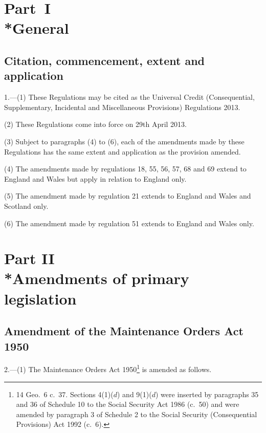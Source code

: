 \documentclass[12pt,a4paper]{article}
\begin{document}
\setcounter{secnumdepth}{-2}

\section[Part I --- General]{Part~I\\*General}

\renewcommand\parthead{--- Part I}

\subsection[1. Citation, commencement, extent and application]{Citation, commencement, extent and application}

1.—(1) These Regulations may be cited as the Universal Credit (Consequential, Supplementary, Incidental and Miscellaneous Provisions) Regulations 2013.

(2) These Regulations come into force on 29th April 2013.

(3) Subject to paragraphs (4) to (6), each of the amendments made by these Regulations has the same extent and application as the provision amended.

(4) The amendments made by regulations 18, 55, 56, 57, 68 and 69 extend to England and Wales but apply in relation to England only.

(5) The amendment made by regulation 21 extends to England and Wales and Scotland only.

(6) The amendment made by regulation 51 extends to England and Wales only.

\section[Part II --- Amendments of primary legislation]{Part II\\*Amendments of primary legislation}

\renewcommand\parthead{--- Part II}

\subsection[2. Amendment of the Maintenance Orders Act 1950]{Amendment of the Maintenance Orders Act 1950}

2.—(1) The Maintenance Orders Act 1950\footnote{14 Geo.~6 c.~37. Sections 4(1)($d$)  and 9(1)($d$)  were inserted by paragraphs 35 and 36 of Schedule 10 to the Social Security Act 1986 (c.~50) and were amended by paragraph 3 of Schedule 2 to the Social Security (Consequential Provisions) Act 1992 (c.~6).} is amended as follows.
\end{document}
